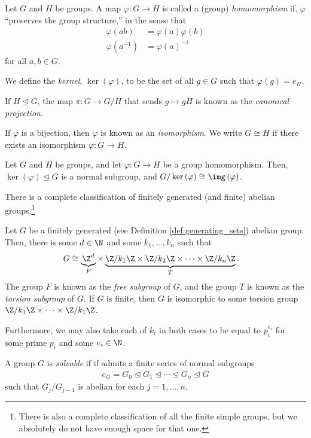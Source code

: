 \begin{definition}
  Let $G$ and $H$ be groups. A map $\varphi\colon G\rightarrow H$ is called a (group) \textit{homomorphism} if, $\varphi$ ``preserves the group structure,'' in the sense that
  \begin{align*}
    \varphi\left(ab\right) &= \varphi(a)\varphi(b)\\
    \varphi\left(a^{-1}\right) &= \varphi(a)^{-1}
  \end{align*}
  for all $a,b\in G$.\newline

  We define the \textit{kernel}, $\ker\left(\varphi\right)$, to be the set of all $g\in G$ such that $\varphi\left(g\right) = e_H$.\newline

  If $H\trianglelefteq G$, the map $\pi\colon G\rightarrow G/H$ that sends $g\mapsto gH$ is known as the \textit{canonical projection}.\newline

  If $\varphi$ is a bijection, then $\varphi$ is known as an \textit{isomorphism}. We write $G\cong H$ if there exists an isomorphism $\varphi\colon G\rightarrow H$.
\end{definition}
\begin{theorem}
  Let $G$ and $H$ be groups, and let $\varphi\colon G\rightarrow H$ be a group homomorphism. Then, $\ker\left(\varphi\right)\trianglelefteq G$ is a normal subgroup, and $G/\ker\left(\varphi\right)\cong \img\left(\varphi\right)$.
\end{theorem}
There is a complete classification of finitely generated (and finite) abelian groups.\footnote{There is also a complete classification of all the finite simple groups, but we absolutely do not have enough space for that one.}
\begin{theorem}\label{thm:fundamental_thm_abelian_gps}
  Let $G$ be a finitely generated (see Definition \ref{def:generating_sets}) abelian group. Then, there is some $d\in \N$ and some $k_1,\dots,k_n$ such that
  \begin{align*}
    G &\cong \underbrace{\Z^{d}}_{F}\times \underbrace{\Z/k_1\Z \times \Z/k_2\Z \times \cdots \times \Z/k_n\Z}_{T}. 
  \end{align*}
  The group $F$ is known as the \textit{free subgroup} of $G$, and the group $T$ is known as the \textit{torsion subgroup} of $G$. If $G$ is finite, then $G$ is isomorphic to some torsion group $\Z/k_1\Z\times \cdots \times \Z/k_1\Z$.\newline

  Furthermore, we may also take each of $k_i$ in both cases to be equal to $p_i^{e_i}$ for some prime $p_i$ and some $e_i\in \N$.
\end{theorem}
\begin{definition}
  A group $G$ is \textit{solvable} if if admits a finite series of normal subgroups
  \begin{align*}
    e_G = G_0\trianglelefteq G_1\trianglelefteq \cdots \trianglelefteq G_n \trianglelefteq G
  \end{align*}
  such that $G_{j}/G_{j-1}$ is abelian for each $j = 1,\dots,n$.
\end{definition}

